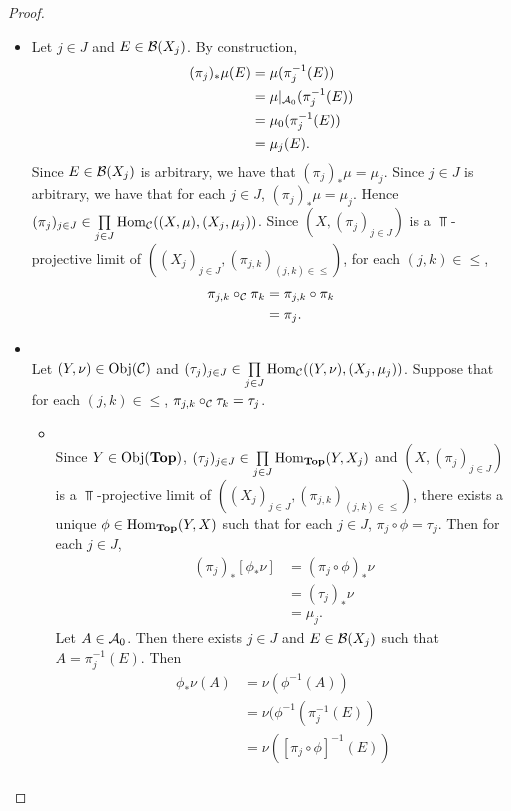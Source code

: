 \documentclass{book}
\begin{document}
\begin{proof}
\begin{enumerate}
\begin{itemize}
			\item Let $j \in J$ and $E \in \mathcal{B}(X_j)$. By construction, 
			\begin{align*}
				(\pi_j)_*\mu(E)
				& = \mu(\pi_j^{-1}(E)) \\
				& = \mu|_{\mathcal{A}_0}(\pi_j^{-1}(E)) \\
				& = \mu_0(\pi_j^{-1}(E)) \\
				& = \mu_j(E).
			\end{align*}
			Since $E \in \mathcal{B}(X_j)$ is arbitrary, we have that $(\pi_j)_*\mu = \mu_j$. Since $j \in J$ is arbitrary, we have that for each $j \in J$, $(\pi_j)_*\mu = \mu_j$. Hence $(\pi_j)_{j \in J} \in \prod\limits_{j \in J} \operatorname{Hom}_{\mathcal{C}}((X, \mu), (X_j, \mu_j))$. Since $(X, (\pi_j)_{j \in J})$ is a $\Top$-projective limit of $((X_j)_{j \in J}, (\pi_{j,k})_{(j,k) \in {\leq}})$, for each $(j,k) \in {\leq}$, 
			\begin{align*}
				\pi_{j,k} \circ_{\mathcal{C}} \pi_k 
				& = \pi_{j,k} \circ \pi_k \\
				& = \pi_j.
			\end{align*}
			\item {} \\
			Let $(Y, \nu) \in \operatorname{Obj}(\mathcal{C})$ and $(\tau_j)_{j \in J} \in \prod\limits_{j \in J} \operatorname{Hom}_{\mathcal{C}}((Y, \nu),(X_j, \mu_j))$. Suppose that for each $(j,k) \in {\leq}$, $\pi_{j,k} \circ_{\mathcal{C}} \tau_k = \tau_j$. 
			\begin{itemize}
				\item {} \\
				Since $Y \in \operatorname{Obj}(\operatorname*{\text{\textbf{Top}}})$, $(\tau_j)_{j \in J} \in \prod\limits_{j \in J} \operatorname{Hom}_{\operatorname*{\text{\textbf{Top}}}}(Y,X_j)$ and $(X, (\pi_j)_{j \in J})$ is a $\Top$-projective limit of $((X_j)_{j \in J}, (\pi_{j,k})_{(j,k) \in {\leq}})$, there exists a unique $\phi \in \operatorname{Hom}_{\operatorname*{\text{\textbf{Top}}}}(Y, X)$ such that for each $j \in J$, $\pi_j \circ \phi = \tau_j$. Then for each $j \in J$,
				\begin{align*}
					(\pi_j)_*[\phi_*\nu]
					& = (\pi_j \circ \phi)_*\nu \\
					& = (\tau_j)_*\nu \\
					& = \mu_j.  
				\end{align*}
				Let $A \in \mathcal{A}_0$. Then there exists $j \in J$ and $E \in \mathcal{B}(X_j)$ such that $A = \pi_{j}^{-1}(E)$. Then
				\begin{align*}
					\phi_*\nu(A)
					& = \nu(\phi^{-1}(A)) \\
					& = \nu(\phi^{-1}(\pi_j^{-1}(E)) \\
					& = \nu([\pi_j \circ \phi]^{-1}(E)) \\

\end{align*}
\end{itemize}
\end{itemize}
\end{enumerate}
\end{proof}
\end{document}
